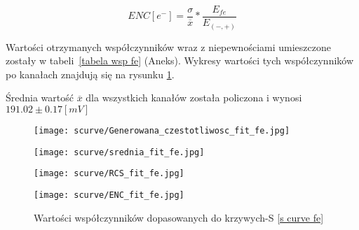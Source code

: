 \begin{equation}
        ENC [e^-] = \frac{\sigma}{\overline{x}} * \frac{E_{fe}}{E_{(-,+)}}
\end{equation}

Wartości otrzymanych współczynników wraz z niepewnościami umieszczone zostały w tabeli~\ref{tabela wsp fe} (Aneks). Wykresy wartości tych współczynników po kanałach znajdują się na rysunku \ref{wyk wsp fe}.

Średnia wartość $\overline{x}$ dla wszystkich kanałów została policzona i wynosi $191.02 \pm 0.17 [mV]$




\begin{figure}
        \begin{multicols}{2}
                \texttt{[image: scurve/Generowana\_czestotliwosc\_fit\_fe.jpg]} \par
                \texttt{[image: scurve/srednia\_fit\_fe.jpg]} \par       
        \end{multicols} \hfill
        \begin{multicols}{2}
                \texttt{[image: scurve/RCS\_fit\_fe.jpg]} \par
                \texttt{[image: scurve/ENC\_fit\_fe.jpg]} \par
        \end{multicols}
        \caption{Wartości współczynników dopasowanych do krzywych-S \ref{s curve fe}}
        \label{wyk wsp fe}
\end{figure}